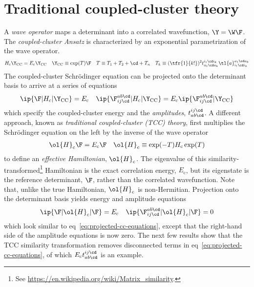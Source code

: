 \chapter{Traditional coupled-cluster theory}

\begin{dfn}\label{dfn:cc-effective-hamiltonian}
A \textit{wave operator} maps a determinant into a correlated wavefunction, $\Y=\W\F$.
The \textit{coupled-cluster Ansatz} is characterized by an exponential parametrization of the wave operator.
\begin{align}
\label{eq:cc-effective-hamiltonian}
  H_{\text{c}}\Y_{\text{CC}}
=
  E_{\text{c}}\Y_{\text{CC}}
&&
  \Y_{\text{CC}}
\equiv
  \text{exp}(T)
  \F
&&
  T
\equiv
  T_1
+
  T_2
+
  \cd
+
  T_n
&&
  T_k
\equiv
  (\tfr{1}{k!})^2
  t_{a_1\cd a_k}^{i_1\cd i_k}
  \tl{a}^{a_1\cd a_k}_{i_1\cd i_k}
\end{align}
The coupled-cluster Schr\"odinger equation can be projected onto the determinant basis to arrive at a series of equations
\begin{align}
\label{eq:projected-cc-equations}
  \ip{\F|H_{\text{c}}|\Y_{\text{CC}}}
=
  E_{\text{c}}
&&
  \ip{\F_{ij\cd}^{ab\cd}|H_{\text{c}}|\Y_{\text{CC}}}
=
  E_{\text{c}}
  \ip{\F_{ij\cd}^{ab\cd}|\Y_{\text{CC}}}
\end{align}
which specify the coupled-cluster energy and the \textit{amplitudes}, $t_{ab\cd}^{ij\cd}$.
A different approach, known as \textit{traditional coupled-cluster (TCC) theory}, first multiplies the Schr\"odinger equation on the left by the inverse of the wave operator
\begin{align}
  \ol{H}_{\text{c}}
  \F
=
  E_{\text{c}}
  \F
&&
  \ol{H}_{\text{c}}
\equiv
  \text{exp}(-T)
  H_{\text{c}}\,
  \text{exp}(T)
\end{align}
to define an \textit{effective Hamiltonian}, $\ol{H}_{\text{c}}$.
The eigenvalue of this similarity-transformed\footnote{See \url{https://en.wikipedia.org/wiki/Matrix_similarity}.} Hamiltonian is the exact correlation energy, $E_{\text{c}}$, but its eigenstate is the reference determinant, $\F$, rather than the correlated wavefunction.
Note that, unlike the true Hamiltonian, $\ol{H}_{\text{c}}$ is non-Hermitian.
Projection onto the determinant basis yields energy and amplitude equations
\begin{align}
\label{eq:traditional-cc-equations}
  \ip{\F|\ol{H}_{\text{c}}|\F}
=
  E_{\text{c}}
&&
  \ip{\F_{ij\cd}^{ab\cd}|\ol{H}_{\text{c}}|\F}
=
  0
\end{align}
which look similar to eq~\ref{eq:projected-cc-equations}, except that the right-hand side of the amplitude equations is now zero.
The next few results show that the TCC similarity transformation removes disconnected terms in eq~\ref{eq:projected-cc-equations}, of which $E_{\text{c}}t_{ab\cd}^{ij\cd}$ is an example.
\end{dfn}


